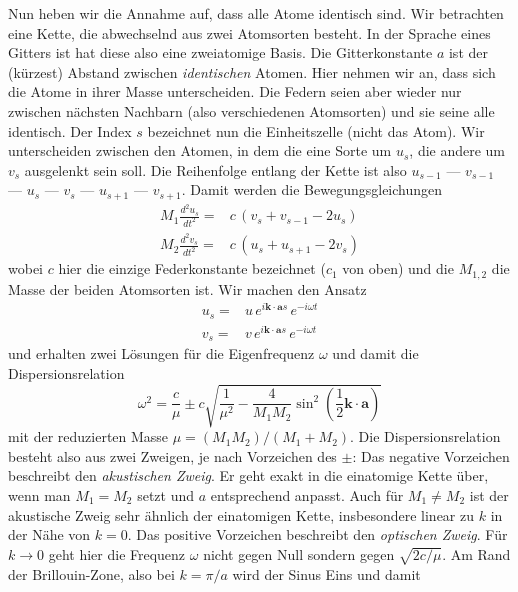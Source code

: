 Nun heben wir die Annahme auf, dass alle Atome identisch sind. Wir betrachten eine Kette, die abwechselnd aus zwei Atomsorten besteht. In der Sprache eines Gitters ist hat diese also eine zweiatomige Basis. Die Gitterkonstante $a$ ist der (kürzest) Abstand zwischen \emph{identischen} Atomen. Hier nehmen wir an, dass sich die Atome in ihrer Masse unterscheiden. Die Federn seien aber wieder nur zwischen nächsten Nachbarn (also verschiedenen Atomsorten) und sie seine alle identisch. Der Index $s$ bezeichnet nun die Einheitszelle (nicht das Atom). Wir unterscheiden zwischen den Atomen, in dem die eine Sorte um $u_s$, die andere um $v_s$ ausgelenkt sein soll.  Die Reihenfolge entlang der Kette ist also $u_{s-1}$ ---  $v_{s-1}$ --- $u_{s}$ ---  $v_{s}$ --- $u_{s+1}$ ---  $v_{s+1}$. Damit werden die Bewegungsgleichungen
\begin{align}
 M_1 \frac{d^2 u_s}{dt^2} = & c \, \left( v_s + v_{s-1} - 2 u_s \right) \\
 M_2 \frac{d^2 v_s}{dt^2} = & c \, \left( u_s + u_{s+1} - 2 v_s \right) 
\end{align}
wobei $c$ hier die einzige Federkonstante bezeichnet ($c_1$ von oben) und die $M_{1,2}$ die Masse der beiden Atomsorten ist.
Wir machen den Ansatz
\begin{align}
  u_s   = & u \,   e^{i \mathbf{k} \cdot \mathbf{a}  s} \, e^{-i \omega t} \\
  v_s  = & v  \, e^{i \mathbf{k} \cdot \mathbf{a}  s} \, e^{-i \omega t}
\end{align}
und erhalten zwei Lösungen für die Eigenfrequenz $\omega$ und damit die Dispersionsrelation
\begin{equation}
\omega^2 =  \frac{c}{\mu}
\pm c \sqrt{ \frac{1}{\mu^2} - \frac{4}{M_1 M_2}  \sin^2 \left( \frac{1}{2}  \mathbf{k} \cdot \mathbf{a} \right) }  \label{eq:phonon_2atom}
\end{equation}
mit der reduzierten Masse $\mu = (M_1  M_2)/(M_1 + M_2)$. Die Dispersionsrelation besteht also aus zwei Zweigen, je nach Vorzeichen des $\pm$: Das negative Vorzeichen beschreibt den \emph{akustischen Zweig}. Er geht exakt in die einatomige Kette über, wenn man $M_1 = M_2$ setzt und $a$ entsprechend anpasst. Auch für $M_1 \neq M_2$ ist der akustische Zweig sehr ähnlich der einatomigen Kette, insbesondere linear zu $k$ in der Nähe von $k=0$. Das positive Vorzeichen beschreibt den \emph{optischen Zweig}. Für $k \rightarrow 0$ geht hier die Frequenz $\omega$ nicht gegen Null sondern gegen $\sqrt{2 c / \mu}$. Am Rand der Brillouin-Zone, also bei $k = \pi /a $ wird der Sinus Eins und damit
